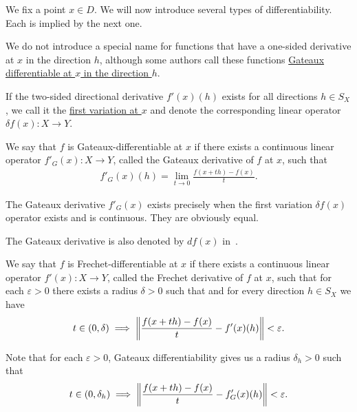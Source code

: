 \begin{definition}\label{def:banach_space_differentiability}
  We fix a point $x \in D$. We will now introduce several types of differentiability. Each is implied by the next one.

  \begin{defenum}
    \item We do not introduce a special name for functions that have a one-sided derivative at $x$ in the direction $h$, although some authors call these functions \uline{Gateaux differentiable at $x$ in the direction $h$}. %

    \item\cite[0.2.1]{Ioffe1974} If the two-sided directional derivative $f'(x)(h)$ exists for all directions $h \in S_X$, we call it the \uline{first variation at $x$} and denote the corresponding linear operator $\delta f(x): X \to Y$.

    \item\cite[definition 1.12]{Phelps1993} We say that $f$ is Gateaux-differentiable at $x$ if there exists a continuous linear operator $f'_G(x): X \to Y$, called the Gateaux derivative of $f$ at $x$, such that
    \begin{align*}
      f'_G(x)(h) = \lim_{t \to 0} \frac {f(x + th) - f(x)} t.
    \end{align*}

    The Gateaux derivative $f'_G(x)$ exists precisely when the first variation $\delta f(x)$ operator exists and is continuous. They are obviously equal.

    The Gateaux derivative is also denoted by $df(x)$ in~\cite[definition 1.12]{Phelps1993}.

    \item\cite[definition 1.12]{Phelps1993} We say that $f$ is Frechet-differentiable at $x$ if there exists a continuous linear operator $f'(x): X \to Y$, called the Frechet derivative of $f$ at $x$, such that for each $\varepsilon > 0$ there exists a radius $\delta > 0$ such that and for every direction $h \in S_X$ we have
    \begin{align*}
      t \in (0, \delta) \implies \left\Vert  \frac {f(x + th) - f(x)} t - f'(x)(h) \right\Vert < \varepsilon.
    \end{align*}

    Note that for each $\varepsilon > 0$, Gateaux differentiability gives us a radius $\delta_h > 0$ such that
    \begin{align*}
      t \in (0, \delta_h) \implies \left\Vert  \frac {f(x + th) - f(x)} t - f_G'(x)(h) \right\Vert < \varepsilon.
    \end{align*}


\end{defenum}
\end{definition}
